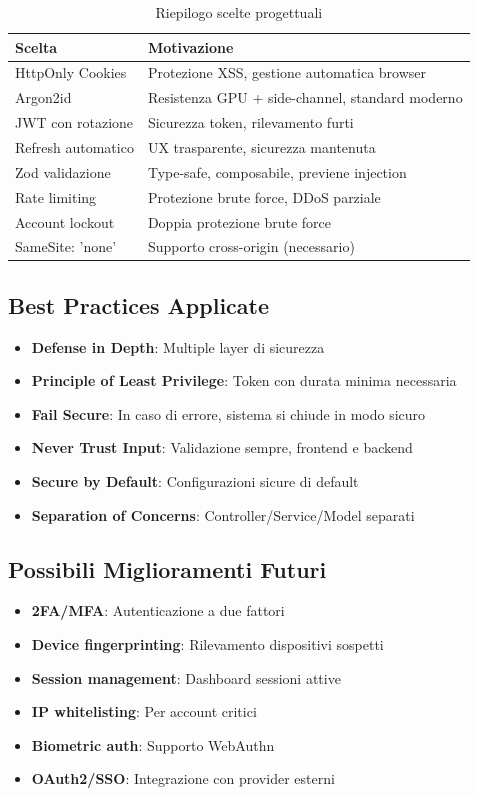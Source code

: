\documentclass[11pt,a4paper]{article}
\begin{document}
\begin{table}[H]
\centering
\begin{tabular}{@{}ll@{}}
\toprule
\textbf{Scelta} & \textbf{Motivazione} \\
\midrule
HttpOnly Cookies & Protezione XSS, gestione automatica browser \\
Argon2id & Resistenza GPU + side-channel, standard moderno \\
JWT con rotazione & Sicurezza token, rilevamento furti \\
Refresh automatico & UX trasparente, sicurezza mantenuta \\
Zod validazione & Type-safe, composabile, previene injection \\
Rate limiting & Protezione brute force, DDoS parziale \\
Account lockout & Doppia protezione brute force \\
SameSite: 'none' & Supporto cross-origin (necessario) \\
\bottomrule
\end{tabular}
\caption{Riepilogo scelte progettuali}
\end{table}

\subsection{Best Practices Applicate}

\begin{itemize}
    \item \textbf{Defense in Depth}: Multiple layer di sicurezza
    \item \textbf{Principle of Least Privilege}: Token con durata minima necessaria
    \item \textbf{Fail Secure}: In caso di errore, sistema si chiude in modo sicuro
    \item \textbf{Never Trust Input}: Validazione sempre, frontend e backend
    \item \textbf{Secure by Default}: Configurazioni sicure di default
    \item \textbf{Separation of Concerns}: Controller/Service/Model separati
\end{itemize}

\subsection{Possibili Miglioramenti Futuri}

\begin{itemize}
    \item \textbf{2FA/MFA}: Autenticazione a due fattori
    \item \textbf{Device fingerprinting}: Rilevamento dispositivi sospetti
    \item \textbf{Session management}: Dashboard sessioni attive
    \item \textbf{IP whitelisting}: Per account critici
    \item \textbf{Biometric auth}: Supporto WebAuthn
    \item \textbf{OAuth2/SSO}: Integrazione con provider esterni
\end{itemize}
\end{document}
